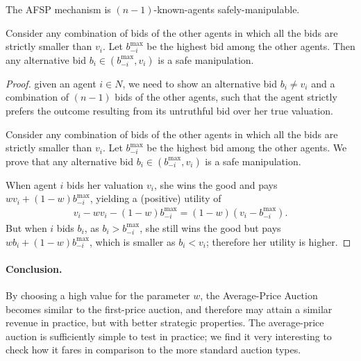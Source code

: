 \begin{lemmarep}
The AFSP mechanism is $(n-1)$-known-agents safely-manipulable.
\end{lemmarep}
\begin{proofsketch}
Consider any combination of bids of the other agents in which all the bids are strictly smaller than $v_i$. 
Let $b^{\max}_{-i}$ be the highest bid among the other agents. 
Then any alternative bid $b_i \in (b^{\max}_{-i}, v_i)$ is a safe manipulation.
\end{proofsketch}
\begin{proof}
given an agent $i \in N$, we need to show an alternative bid $b_i\neq v_i$ and a combination of $(n-1)$ bids of the other agents, such that the agent strictly prefers the outcome resulting from its untruthful bid over her true valuation.

Consider any combination of bids of the other agents in which all the bids are strictly smaller than $v_i$. 
Let $b^{\max}_{-i}$ be the highest bid among the other agents. 
We prove that any alternative bid $b_i \in (b^{\max}_{-i}, v_i)$ is a safe manipulation.

When agent $i$ bids her valuation $v_i$, she wins the good and pays $w v_i + (1-w) b^{\max}_{-i}$, yielding a (positive) utility of 
\begin{align*}
    v_i- w v_i - (1-w)b^{\max}_{-i}
    =
    (1-w) (v_i - b^{\max}_{-i}).
\end{align*}
But when $i$ bids $b_i$, as $b_i > b^{\max}_{-i}$, she still wins the good but pays $w b_i + (1-w) b^{\max}_{-i}$, which is smaller as $b_i<v_i$; therefore her utility is higher.
\end{proof}

\paragraph{Conclusion.}
By choosing a high value for the parameter $w$, the Average-Price Auction becomes similar to the first-price auction, and therefore may attain a similar revenue in practice, but with better strategic properties. 
The average-price auction is sufficiently simple to test in practice; we find it very interesting to check how it fares in comparison to the more standard auction types.

